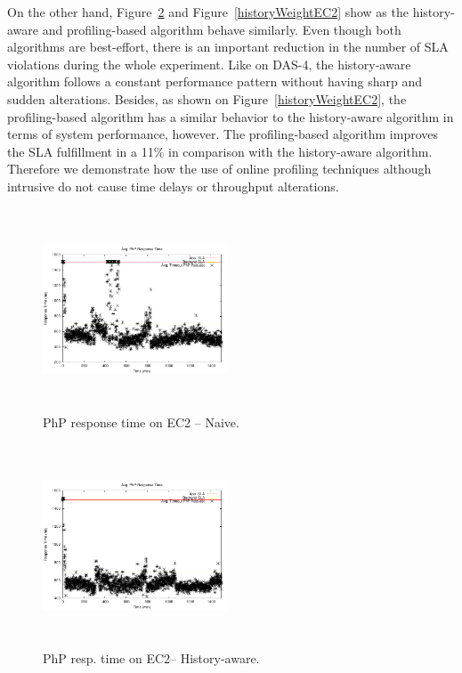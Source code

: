 On the other hand, Figure~\ref{historyEC2} and Figure~\ref{historyWeightEC2} show as the history-aware and profiling-based algorithm behave similarly. Even though both algorithms are best-effort, there is an important reduction in the number of SLA violations during the whole experiment. Like on DAS-4, the history-aware algorithm follows a constant performance pattern without having sharp and sudden alterations. Besides, as shown on Figure~\ref{historyWeightEC2}, the profiling-based algorithm has a similar behavior to the history-aware algorithm in terms of system performance, however. The profiling-based algorithm improves the SLA fulfillment in a 11\% in comparison with the history-aware algorithm. Therefore we demonstrate how the use of online profiling techniques although intrusive do not cause time delays or throughput alterations. 


\begin{figure}
\begin{center}
\includegraphics[width=0.49\textwidth, height=6cm]{./images/heterogeneous/avgTimeout_PhP_naive}
\end{center}
\caption{PhP  response time on EC2 -- Naive.}
\label{naiveEC2}
\end{figure}


\begin{figure}
\begin{center}
\includegraphics[width=0.49\textwidth, height=6cm]{./images/heterogeneous/avgTimeout_PhP_history}
\end{center}
\caption{PhP resp. time on EC2-- History-aware.}
\label{historyEC2}
\end{figure}

